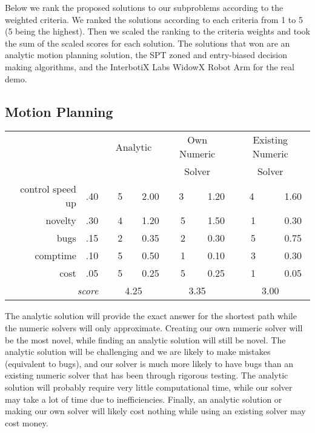 \documentclass [11pt ]{ report}
\begin{document}
Below we rank the proposed solutions to our subproblems according to the weighted criteria. We ranked the solutions according to each criteria from 1 to 5 (5 being the highest). Then we scaled the ranking to the criteria weights and took the sum of the scaled scores for each solution. The solutions that won are an analytic motion planning solution, the SPT zoned and entry-biased decision making algorithms, and the InterbotiX Labs WidowX Robot Arm for the real demo.


\subsection{Motion Planning}
\begin{center}
  \begin{tabular}{r|r||c|c||c|c||c|c||}
                   \multicolumn{2}{c||}{} 
                     & \multicolumn{2}{c||}{Analytic}  
                     & \multicolumn{2}{c||}{Own Numeric}
                     & \multicolumn{2}{c||}{Existing Numeric} \\ 
                   \multicolumn{2}{c||}{} 
                     & \multicolumn{2}{c||}{}  
                     & \multicolumn{2}{c||}{Solver}
                     & \multicolumn{2}{c||}{Solver} \\ \hline
  control speed up     & .40 &  \ \ 5\ \ & 2.00 & \ \ 3 \ \  & 1.20 & \ \ 4 \ \  & 1.60 \\
  novelty & .30 &  4     &   1.20  & 5  & 1.50  & 1  & 0.30 \\
  bugs           & .15 &  2     &   0.35  & 2  & 0.30  & 5  & 0.75 \\
  comptime               & .10 &  5     &   0.50  & 1  & 0.10  & 3  & 0.30  \\
  cost				 &  .05 &  5     &   0.25  & 5  & 0.25  & 1  & 0.05  \\ 
  
  \hline
  
  \multicolumn{2}{r||}{\emph{score}} & 
  \multicolumn{2}{c||}{4.25 }  &
  \multicolumn{2}{c||}{3.35 } &
  \multicolumn{2}{c||}{3.00 } 
\end{tabular}
\end{center}

The analytic solution will provide the exact answer for the shortest path while the numeric solvers will only approximate. Creating our own numeric solver will be the most novel, while finding an analytic solution will still be novel. The analytic solution will be challenging and we are likely to make mistakes (equivalent to bugs), and our solver is much more likely to have bugs than an existing numeric solver that has been through rigorous testing. The analytic solution will probably require very little computational time, while our solver may take a lot of time due to inefficiencies. Finally, an analytic solution or making our own solver will likely cost nothing while using an existing solver may cost money. 
\end{document}
